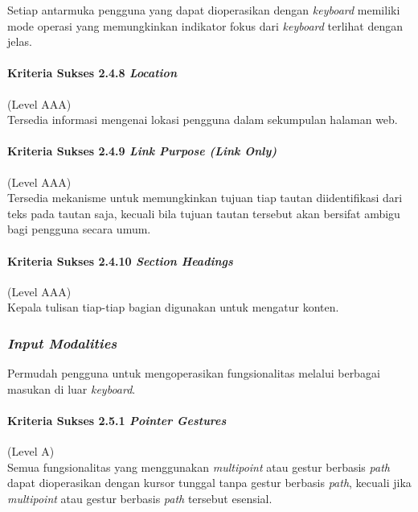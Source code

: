 Setiap antarmuka pengguna yang dapat dioperasikan dengan \textit{keyboard} memiliki mode operasi yang memungkinkan indikator fokus dari \textit{keyboard} terlihat dengan jelas.

\paragraph{Kriteria Sukses 2.4.8 \textit{Location}}
\label{sec:kriteria_sukses_2.4.8}
(Level AAA)\\

Tersedia informasi mengenai lokasi pengguna dalam sekumpulan halaman web.

\paragraph{Kriteria Sukses 2.4.9 \textit{Link Purpose (Link Only)}}
\label{sec:kriteria_sukses_2.4.9}
(Level AAA)\\

Tersedia mekanisme untuk memungkinkan tujuan tiap tautan diidentifikasi dari teks pada tautan saja, kecuali bila tujuan tautan tersebut akan bersifat ambigu bagi pengguna secara umum.

\paragraph{Kriteria Sukses 2.4.10 \textit{Section Headings}}
\label{sec:kriteria_sukses_2.4.10}
(Level AAA)\\

Kepala tulisan tiap-tiap bagian digunakan untuk mengatur konten.

\subsubsection{\textit{Input Modalities}}
\label{sec:input_modalities}
Permudah pengguna untuk mengoperasikan fungsionalitas melalui berbagai masukan di luar \textit{keyboard}.

\paragraph{Kriteria Sukses 2.5.1 \textit{Pointer Gestures}}
\label{sec:kriteria_sukses_2.5.1}
(Level A)\\

Semua fungsionalitas yang menggunakan \textit{multipoint} atau gestur berbasis \textit{path} dapat dioperasikan dengan kursor tunggal tanpa gestur berbasis \textit{path}, kecuali jika \textit{multipoint} atau gestur berbasis \textit{path} tersebut esensial.

